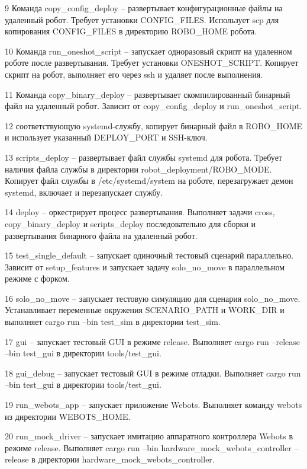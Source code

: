 9 Команда         {copy\_config\_deploy} -- развертывает конфигурационные файлы на
удаленный робот. Требует установки CONFIG\_FILES. Использует scp для
копирования CONFIG\_FILES в директорию ROBO\_HOME робота.

10 Команда          {run\_oneshot\_script} -- запускает одноразовый скрипт на удаленном
роботе после развертывания. Требует установки ONESHOT\_SCRIPT. Копирует
скрипт на робот, выполняет его через ssh и удаляет после выполнения.

11 Команда           {copy\_binary\_deploy} -- развертывает скомпилированный бинарный файл на удаленный робот. Зависит от copy\_config\_deploy и run\_oneshot\_script.

12            соответствующую systemd-службу, копирует бинарный файл в
ROBO\_HOME и использует указанный DEPLOY\_PORT и SSH-ключ.

13             {scripts\_deploy} -- развертывает файл службы systemd для робота.
Требует наличия файла службы в директории robot\_deployment/ROBO\_MODE.
Копирует файл службы в /etc/systemd/system на роботе, перезагружает демон
systemd, включает и перезапускает службу.

14              {deploy} -- оркестрирует процесс развертывания. Выполняет задачи cross,
copy\_binary\_deploy и scripts\_deploy последовательно для сборки и
развертывания бинарного файла на удаленный робот.

15               {test\_single\_default} -- запускает одиночный тестовый сценарий
параллельно. Зависит от setup\_features и запускает задачу solo\_no\_move в
параллельном режиме с форком.

16                {solo\_no\_move} -- запускает тестовую симуляцию для сценария
solo\_no\_move. Устанавливает переменные окружения SCENARIO\_PATH и
WORK\_DIR и выполняет cargo run --bin test\_sim в директории test\_sim.

17                 {gui} -- запускает тестовый GUI в режиме release. Выполняет cargo run
--release --bin test\_gui в директории tools/test\_gui.

18                  {gui\_debug} -- запускает тестовый GUI в режиме отладки. Выполняет cargo
run --bin test\_gui в директории tools/test\_gui.

19                   {run\_webots\_app} -- запускает приложение Webots. Выполняет команду
webots из директории WEBOTS\_HOME.

20                    {run\_mock\_driver} -- запускает имитацию аппаратного контроллера Webots
в режиме release. Выполняет cargo run --bin
hardware\_mock\_webots\_controller --release в директории
hardware\_mock\_webots\_controller.

